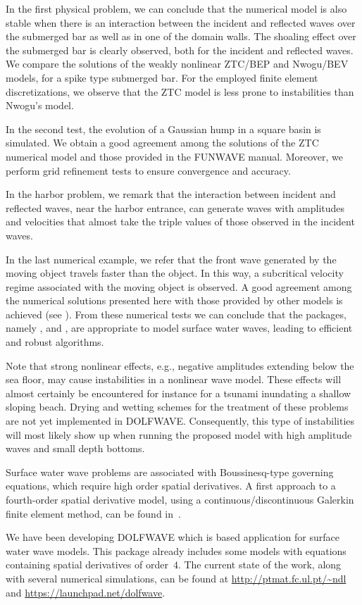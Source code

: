In the first physical problem, we can conclude that the numerical
model is also stable when there is an interaction between the incident
and reflected waves over the submerged bar as well as in one of the
domain walls. The shoaling effect over the submerged bar is clearly
observed, both for the incident and reflected waves.  We compare the
solutions of the weakly nonlinear ZTC/BEP and Nwogu/BEV models, for a
spike type submerged bar.  For the employed finite element
discretizations, we observe that the ZTC model is less prone to
instabilities than Nwogu's model.

In the second test, the evolution of a Gaussian hump in a square basin
is simulated.  We obtain a good agreement among the solutions of the
ZTC numerical model and those provided in the FUNWAVE manual.
Moreover, we perform grid refinement tests to ensure convergence and
accuracy.

In the harbor problem, we remark that the interaction between incident
and reflected waves, near the harbor entrance, can generate waves with
amplitudes and velocities that almost take the triple values of those
observed in the incident waves.

In the last numerical example, we refer that the front wave generated
by the moving object travels faster than the object.  In this way, a
subcritical velocity regime associated with the moving object is
observed.  A good agreement among the numerical solutions presented
here with those provided by other models is achieved (see
).  From these numerical tests we can conclude that
the \fenics packages, namely \dolfin, \ufl and \ffc, are appropriate
to model surface water waves, leading to efficient and robust
algorithms.

Note that strong nonlinear effects, e.g., negative amplitudes
extending below the sea floor, may cause instabilities in a nonlinear
wave model.  These effects will almost certainly be encountered for
instance for a tsunami inundating a shallow sloping beach.  Drying and
wetting schemes for the treatment of these problems are not yet
implemented in DOLFWAVE.  Consequently, this type of instabilities
will most likely show up when running the proposed model with high
amplitude waves and small depth bottoms.

Surface water wave problems are associated with Boussinesq-type
governing equations, which require high order spatial derivatives. A
first approach to a fourth-order spatial derivative model, using a
continuous/discontinuous Galerkin finite element method, can be found
in~\citet{LopesPereiraTrabucho}.

We have been developing DOLFWAVE which is \fenics based application
for surface water wave models. This package already includes some
models with equations containing spatial derivatives of order~$4$.
The current state of the work, along with several numerical
simulations, can be found at \url{http://ptmat.fc.ul.pt/~ndl} and
\url{https://launchpad.net/dolfwave}.
